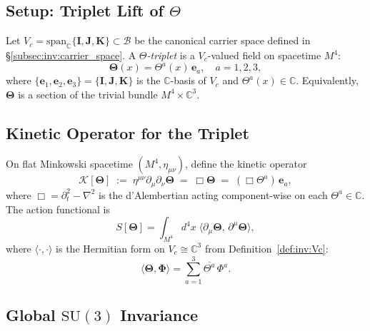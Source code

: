 \subsection{Setup: Triplet Lift of $\Theta$}

Let $V_c = \mathrm{span}_\mathbb{C}\{\mathbf{I},\mathbf{J},\mathbf{K}\}\subset
\mathcal{B}$ be the canonical carrier space defined in
\S\ref{subsec:inv:carrier_space}.  A \emph{$\Theta$-triplet} is a
$V_c$-valued field on spacetime $M^4$:
\begin{equation}
  \label{eq:Theta_triplet}
  \boldsymbol{\Theta}(x) = \Theta^a(x)\,\mathbf{e}_a, \quad a = 1,2,3,
\end{equation}
where $\{\mathbf{e}_1,\mathbf{e}_2,\mathbf{e}_3\}=\{\mathbf{I},\mathbf{J},\mathbf{K}\}$
is the $\mathbb{C}$-basis of $V_c$ and $\Theta^a(x)\in\mathbb{C}$.  Equivalently,
$\boldsymbol{\Theta}$ is a section of the trivial bundle $M^4\times\mathbb{C}^3$.

\subsection{Kinetic Operator for the Triplet}

On flat Minkowski spacetime $(M^4,\eta_{\mu\nu})$, define the kinetic operator
\begin{equation}
  \label{eq:kinetic_operator}
  \mathcal{K}[\boldsymbol{\Theta}]
  \;:=\;
  \eta^{\mu\nu}\partial_\mu\partial_\nu\boldsymbol{\Theta}
  \;=\;
  \Box\boldsymbol{\Theta}
  \;=\;
  (\Box\Theta^a)\,\mathbf{e}_a,
\end{equation}
where $\Box = \partial_t^2 - \nabla^2$ is the d'Alembertian acting
component-wise on each $\Theta^a\in\mathbb{C}$.  The action functional is
\begin{equation}
  \label{eq:triplet_action}
  S[\boldsymbol{\Theta}]
  = \int_{M^4} d^4x\;
    \langle\partial_\mu\boldsymbol{\Theta},\,\partial^\mu\boldsymbol{\Theta}\rangle,
\end{equation}
where $\langle\cdot,\cdot\rangle$ is the Hermitian form on $V_c\cong\mathbb{C}^3$
from Definition~\ref{def:inv:Vc}:
\begin{equation}
  \langle\boldsymbol{\Theta},\boldsymbol{\Phi}\rangle
  = \sum_{a=1}^3 \overline{\Theta^a}\,\Phi^a.
\end{equation}

\subsection{Global $\mathrm{SU}(3)$ Invariance}

